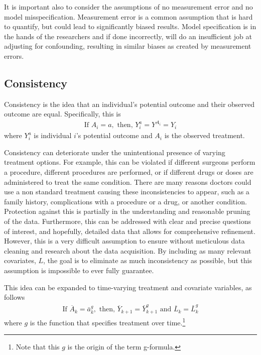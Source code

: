 It is important also to consider the assumptions of no measurement error and no model misspecification.  Measurement error is a common assumption that is hard to quantify, but could lead to significantly biased results.  Model specification is in the hands of the researchers and if done incorrectly, will do an insufficient job at adjusting for confounding, resulting in similar biases as created by measurement errors.  
 
\subsection{Consistency} 
Consistency is the idea that an individual's potential outcome and their observed outcome are equal\cite{cole2009consistency, hernan_robins_2016}.  Specifically, this is 
\begin{align} 
\text{If  } A_i = a, \text{     then,    } Y_i^a = Y^{A_i} = Y_i 
\end{align} 
where $Y_i^a$ is individual $i$'s potential outcome and $A_i$ is the observed treatment.  

Consistency can deteriorate under the unintentional presence of varying treatment options.  For example, this can be violated if different surgeons perform a procedure, different procedures are performed, or if different drugs or doses are administered to treat the same condition.  There are many reasons doctors could use a non standard treatment causing these inconsistencies to appear, such as a family history, complications with a procedure or a drug, or another condition.  Protection against this is partially in the understanding and reasonable pruning of the data.  Furthermore, this can be addressed with clear and precise questions of interest, and hopefully, detailed data that allows for comprehensive refinement.  However, this is a very difficult assumption to ensure without meticulous data cleaning and research about the data acquisition.  By including as many relevant covariates, $L$, the goal is to eliminate as much inconsistency as possible, but this assumption is impossible to ever fully guarantee.  

This idea can be expanded to time-varying treatment and covariate variables, as follows 
\begin{align} 
\text{If } \overline{A}_k = \bar{a}^g _k, \text{ then, } \overline{Y}_{k+1} =  \bar{Y}^g_{k+1} \text{ and } \overline{L}_k = \bar{L}^g_k
\end{align}
where $g$ is the function that specifies treatment over time.\footnote{Note that this $g$ is the origin of the term g-formula.}


